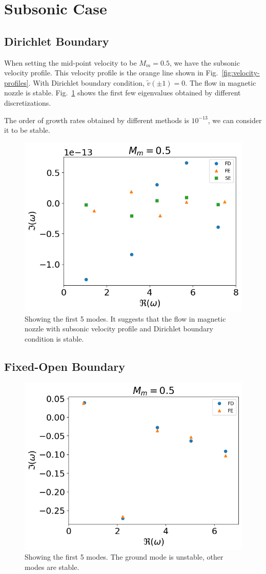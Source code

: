 \section{Subsonic Case}
\subsection{Dirichlet Boundary}
When setting the mid-point velocity to be $M_m=0.5$, we have the subsonic velocity profile. This velocity profile is the orange line shown in Fig.~\ref{fig:velocity-profiles}. With Dirichlet boundary condition, $\tilde{v}(\pm 1) =0$. The flow in magnetic nozzle is stable. Fig.~\ref{fig:subsonic-v-dirichlet} shows the first few eigenvalues obtained by different discretizations.

The order of growth rates obtained by different methods is $10^{-13}$, we can consider it to be stable.
\begin{figure} [H]
	\centering
	\includegraphics[width=0.7\linewidth]{figures/fixed-fixed-subsonic-v}
	\caption{Showing the first 5 modes. It suggests that the flow in magnetic nozzle with subsonic velocity profile and Dirichlet boundary condition is stable.}
	\label{fig:subsonic-v-dirichlet}
\end{figure}

\subsection{Fixed-Open Boundary}
\begin{figure} [H]
	\centering
	\includegraphics[width=0.7\linewidth]{figures/fixed-open-subsonic-v}
	\caption{Showing the first 5 modes. The ground mode is unstable, other modes are stable.}
	\label{fig:subsonic-v-fixed_open}
\end{figure}


